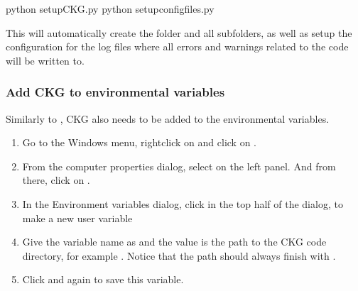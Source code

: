 \documentclass[letterpaper,10pt,english]{sphinxmanual}
\begin{document}
\begin{sphinxVerbatim}[commandchars=\\\{\}]
\PYGZgt{} python setup\PYGZus{}CKG.py
\PYGZgt{} python setup\PYGZus{}config\PYGZus{}files.py
\end{sphinxVerbatim}

This will automatically create the  folder and all subfolders, as well as setup the configuration for the log files where all errors and warnings related to the code will be written to.


\subsubsection{Add CKG to environmental variables}
\label{\detokenize{intro/getting-started-with-windows:add-ckg-to-environmental-variables}}
Similarly to {\hyperref[\detokenize{intro/getting-started-with-windows:add-neo4j-graph-database-to-environmental-variables}]{}}, CKG also needs to be added to the environmental variables.
\begin{enumerate}
%
\item {} 
Go to the Windows menu, right\sphinxhyphen{}click on  and click on .

\item {} 
From the computer properties dialog, select  on the left panel. And from there, click on .

\item {} 
In the Environment variables dialog, click  in the top half of the dialog, to make a new user variable

\item {} 
Give the variable name as  and the value is the path to the CKG code directory, for example . Notice that the path should always finish with .

\item {} 
Click  and  again to save this variable.

\end{enumerate}
\end{document}
